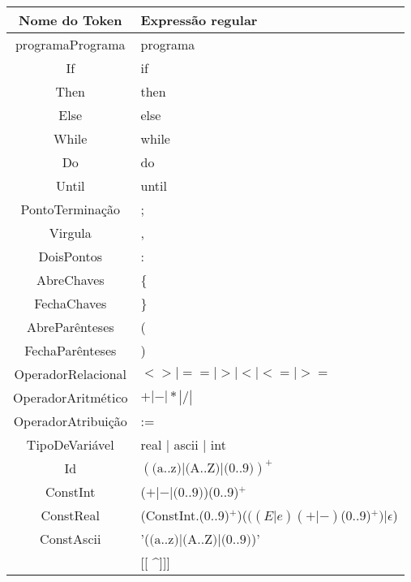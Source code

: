 \documentclass[11pt]{article}
\begin{document}
\begin{tabularx}{\textwidth}{c|X}
    \hline
    \textbf{Nome do Token} & \textbf{Expressão regular}   \\ 
    \hline
    programaPrograma & programa  \\  
    \hline
    If  & if \\
    \hline
    Then & then  \\
    \hline
    Else & else \\
    \hline
    While  & while \\
    \hline
    Do & do \\
    \hline
    Until  & until \\
    \hline
    \hline
    PontoTerminação  & ; \\
    \hline
    Virgula  & , \\
    \hline
    DoisPontos  & : \\
    \hline
    AbreChaves  & \{ \\
    \hline
    FechaChaves  & \} \\
    \hline
    AbreParênteses  & ( \\
    \hline
    FechaParênteses  & ) \\
    \hline
    \hline
    OperadorRelacional & $<> | == | > | < | <= | >= $   \\
    \hline
    OperadorAritmético & $ + | - | * | / |$   \\
    \hline
    \hline
    OperadorAtribuição & := \\
    \hline
    \hline
    TipoDeVariável & real $|$ ascii $|$ int \\  
    \hline
    \hline
    Id & $(\text{(a..z)}|\text{(A..Z)}|\text{(0..9)})^{+}$ \\
    \hline
    \hline
    ConstInt & ($+ | -| \text{(0..9)}$)(0..9)$^{+}$ \\
    \hline
    ConstReal & (ConstInt.(0..9)$^+$)($((E|e)(+|-)$(0..9)$^+) | \epsilon$)  \\
    \hline
    ConstAscii & '($\text{(a..z)}|\text{(A..Z)}|\text{(0..9)}$)' \\    
    \hline
    [\textit{comentário}] & [[ \^{}]]] \\
    \hline
\end{tabularx}
\end{document}
